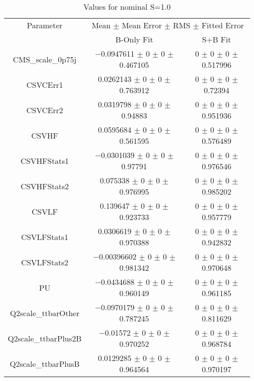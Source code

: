 \begin{table}
\centering
\caption{Values for nominal S=1.0}
\begin{tabular}{ccc}
\toprule
Parameter & \multicolumn{2}{c}{Mean $\pm$ Mean Error $\pm$ RMS $\pm$ Fitted Error}\\
 & B-Only Fit & S+B Fit\\
\midrule
CMS\_scale\_0p75j & \num{-0.0947611} $\pm$ \num{0} $\pm$ \num{0} $\pm$ \num{0.467105} & \num{0} $\pm$ \num{0} $\pm$ \num{0} $\pm$ \num{0.517996}\\
CSVCErr1 & \num{0.0262143} $\pm$ \num{0} $\pm$ \num{0} $\pm$ \num{0.763912} & \num{0} $\pm$ \num{0} $\pm$ \num{0} $\pm$ \num{0.72394}\\
CSVCErr2 & \num{0.0319798} $\pm$ \num{0} $\pm$ \num{0} $\pm$ \num{0.94883} & \num{0} $\pm$ \num{0} $\pm$ \num{0} $\pm$ \num{0.951936}\\
CSVHF & \num{0.0595684} $\pm$ \num{0} $\pm$ \num{0} $\pm$ \num{0.561595} & \num{0} $\pm$ \num{0} $\pm$ \num{0} $\pm$ \num{0.576489}\\
CSVHFStats1 & \num{-0.0301039} $\pm$ \num{0} $\pm$ \num{0} $\pm$ \num{0.97791} & \num{0} $\pm$ \num{0} $\pm$ \num{0} $\pm$ \num{0.976546}\\
CSVHFStats2 & \num{0.075338} $\pm$ \num{0} $\pm$ \num{0} $\pm$ \num{0.976995} & \num{0} $\pm$ \num{0} $\pm$ \num{0} $\pm$ \num{0.985202}\\
CSVLF & \num{0.139647} $\pm$ \num{0} $\pm$ \num{0} $\pm$ \num{0.923733} & \num{0} $\pm$ \num{0} $\pm$ \num{0} $\pm$ \num{0.957779}\\
CSVLFStats1 & \num{0.0306619} $\pm$ \num{0} $\pm$ \num{0} $\pm$ \num{0.970388} & \num{0} $\pm$ \num{0} $\pm$ \num{0} $\pm$ \num{0.942832}\\
CSVLFStats2 & \num{-0.00396602} $\pm$ \num{0} $\pm$ \num{0} $\pm$ \num{0.981342} & \num{0} $\pm$ \num{0} $\pm$ \num{0} $\pm$ \num{0.970648}\\
PU & \num{-0.0434688} $\pm$ \num{0} $\pm$ \num{0} $\pm$ \num{0.960149} & \num{0} $\pm$ \num{0} $\pm$ \num{0} $\pm$ \num{0.961185}\\
Q2scale\_ttbarOther & \num{-0.0970179} $\pm$ \num{0} $\pm$ \num{0} $\pm$ \num{0.787245} & \num{0} $\pm$ \num{0} $\pm$ \num{0} $\pm$ \num{0.811629}\\
Q2scale\_ttbarPlus2B & \num{-0.01572} $\pm$ \num{0} $\pm$ \num{0} $\pm$ \num{0.970252} & \num{0} $\pm$ \num{0} $\pm$ \num{0} $\pm$ \num{0.968784}\\
Q2scale\_ttbarPlusB & \num{0.0129285} $\pm$ \num{0} $\pm$ \num{0} $\pm$ \num{0.964564} & \num{0} $\pm$ \num{0} $\pm$ \num{0} $\pm$ \num{0.970197}\\

\end{tabular}
\end{table}
